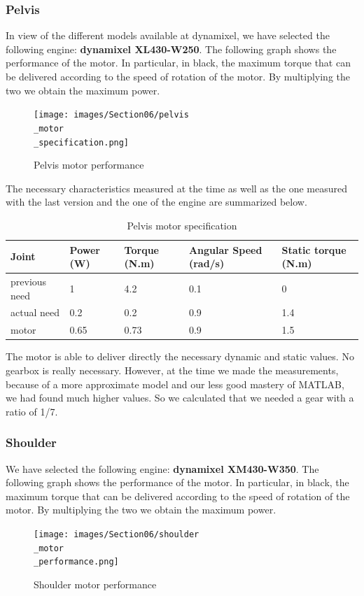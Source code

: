 \subsubsection{Pelvis}

In view of the different models available at dynamixel, we have selected the following engine: \textbf{dynamixel XL430-W250}. The following graph shows the performance of the motor. In particular, in black, the maximum torque that can be delivered according to the speed of rotation of the motor. By multiplying the two we obtain the maximum power.
\begin{figure}[ht]
    \centering
    \texttt{[image: images/Section06/pelvis\\\_motor\\\_specification.png]}
    \caption{Pelvis motor performance}
    \label{fig:mesh15}
\end{figure}
\FloatBarrier

\bigbreak
The necessary characteristics measured at the time as well as the one measured with the last version and the one of the engine are summarized below.
\begin{table}[ht]
    \centering
    \begin{tabular}{|p{1.5cm} | p{2cm} | p{2.5cm}| p{2.7cm} | p{2.7cm} |} 
        \hline
        \textbf{Joint}& \textbf{Power (W)} & \textbf{Torque (N.m)} & \textbf{Angular Speed (rad/s)} & \textbf{Static torque (N.m)}\\ [0.3ex]
        \hline
        previous need & 1 & 4.2 & 0.1 & 0 \\ 
        \hline
        actual need & 0.2 & 0.2 & 0.9 & 1.4 \\ 
        \hline
        motor & 0.65 & 0.73 & 0.9 & 1.5\\ 
        \hline
    \end{tabular}
    \caption{Pelvis motor specification}
\end{table}
\FloatBarrier
The motor is able to deliver directly the necessary dynamic and static values. No gearbox is really necessary. However, at the time we made the measurements, because of a more approximate model and our less good mastery of MATLAB, we had found much higher values. So we calculated that we needed a gear with a ratio of 1/7.

\subsubsection{Shoulder}

 We have selected the following engine: \textbf{dynamixel XM430-W350}. The following graph shows the performance of the motor. In particular, in black, the maximum torque that can be delivered according to the speed of rotation of the motor. By multiplying the two we obtain the maximum power.
\begin{figure}[ht]
    \centering
    \texttt{[image: images/Section06/shoulder\\\_motor\\\_performance.png]}
    \caption{Shoulder motor performance}
    \label{fig:mesh15}
\end{figure}
\FloatBarrier

